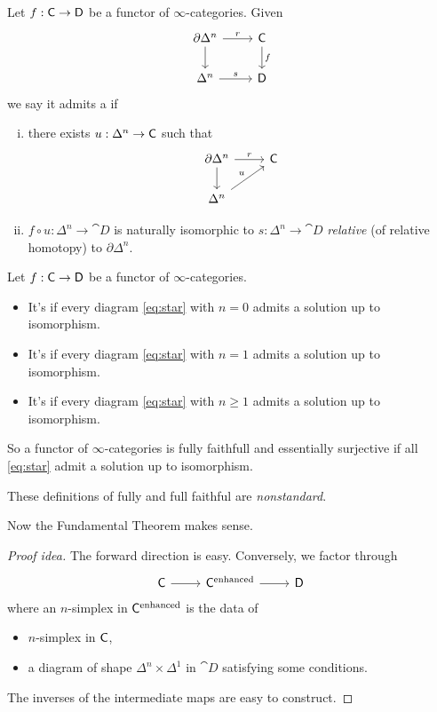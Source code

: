 \begin{definition}
	Let $f:\C\to \cat{D}$ be a functor of $\infty$-categories. Given
	\begin{equation}\label{eq:star}
	\begin{tikzcd}
		\partial \Delta^{n} \ar[r,"r"] \ar[d] & \C \ar[d,"f"] \\
		\Delta^{n} \ar[r,"s"] & \cat{D}
	\end{tikzcd}
	\end{equation}
	we say it admits a  if
	\begin{enumerate}[(i)]
		\item there exists $u:\Delta^{n}\to \C$ such that
			\[
			\begin{tikzcd}
				\partial \Delta^{n} \ar[r,"r"] \ar[d] & \C \\
				\Delta^{n} \ar[ur,"u"]
			\end{tikzcd}
			\] 
		\item $f\circ u:\Delta^{n}\to \cat{D}$ is naturally isomorphic to $s:\Delta^{n}\to \cat{D}$ \emph{relative} (of relative homotopy) to $\partial \Delta^{n}$.
	\end{enumerate}
\end{definition}
\begin{definition}
	Let $f:\C\to \cat{D}$ be a functor of $\infty$-categories. 
	\begin{itemize}
		\item It's  if every diagram \eqref{eq:star} with $n=0$ admits a solution up to isomorphism. 
		\item It's  if every diagram \eqref{eq:star} with $n=1$ admits a solution up to isomorphism.
		\item It's  if every diagram \eqref{eq:star} with $n\ge 1$ admits a solution up to isomorphism.
	\end{itemize}
\end{definition}
So a functor of $\infty$-categories is fully faithfull and essentially surjective if all \eqref{eq:star} admit a solution up to isomorphism.
\begin{remark}
	These definitions of fully and full faithful are \emph{nonstandard}. 
\end{remark}
Now the Fundamental Theorem makes sense.
\begin{proof}[Proof idea]
	The forward direction is easy. Conversely, we factor through
	\[
	\begin{tikzcd}
		\C \ar[r] & \C^{\text{enhanced}} \ar[r] & \cat{D}
	\end{tikzcd}
	\] 
	where an $n$-simplex in $\mathsf{C}^{\text{enhanced}}$ is the data of
	\begin{itemize}
		\item $n$-simplex in $\mathsf{C}$,
		\item a diagram of shape $\Delta^{n}\times \Delta^{1}$ in $\cat{D}$ satisfying some conditions.
	\end{itemize}
	The inverses of the intermediate maps are easy to construct.
\end{proof}
